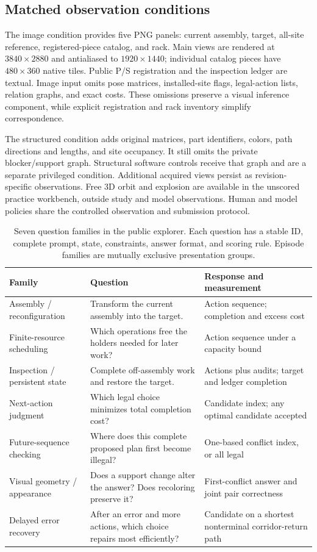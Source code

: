 \documentclass[10pt,twocolumn,letterpaper]{article}
\begin{document}
\subsection{Matched observation conditions}
The image condition provides five PNG panels: current assembly, target,
all-site reference, registered-piece catalog, and rack. Main views are
rendered at $3840\times2880$ and antialiased to $1920\times1440$; individual
catalog pieces have $480\times360$ native tiles. Public P/S registration
and the inspection ledger are textual. Image input omits pose matrices,
installed-site flags, legal-action lists, relation graphs, and exact costs.
These omissions preserve a visual inference component, while explicit
registration and rack inventory simplify correspondence.

The structured condition adds original matrices, part identifiers,
colors, path directions and lengths, and site occupancy. It still omits
the private blocker/support graph. Structural software controls receive
that graph and are a separate privileged condition. Additional acquired
views persist as revision-specific observations. Free 3D orbit and
explosion are available in the unscored practice workbench, outside study
and model observations. Human and model policies share the controlled
observation and submission protocol.

\begin{table}[t]
\centering\small
\caption{Seven question families in the public explorer. Each question
has a stable ID, complete prompt, state, constraints, answer format, and
scoring rule. Episode families are mutually exclusive presentation groups.}
\begin{tabular}{p{}p{}p{}}
\toprule Family & Question & Response and measurement\\\midrule
Assembly / reconfiguration & Transform the current assembly into the target. & Action sequence; completion and excess cost\\
Finite-resource scheduling & Which operations free the holders needed for later work? & Action sequence under a capacity bound\\
Inspection / persistent state & Complete off-assembly work and restore the target. & Actions plus audits; target and ledger completion\\
Next-action judgment & Which legal choice minimizes total completion cost? & Candidate index; any optimal candidate accepted\\
Future-sequence checking & Where does this complete proposed plan first become illegal? & One-based conflict index, or all legal\\
Visual geometry / appearance & Does a support change alter the answer? Does recoloring preserve it? & First-conflict answer and joint pair correctness\\
Delayed error recovery & After an error and more actions, which choice repairs most efficiently? & Candidate on a shortest nonterminal corridor-return path\\
\bottomrule
\end{tabular}
\label{tab:taxonomy}
\end{table}
\end{document}
